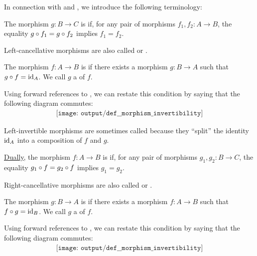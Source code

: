 \begin{definition}\label{def:morphism_invertibility}
  In connection with  and , we introduce the following terminology:
  \begin{thmenum}
     The morphism \( g: B \to C \) is  if, for any pair of morphisms \( f_1, f_2: A \to B \), the equality \( g \bincirc f_1 = g \bincirc f_2 \) implies \( f_1 = f_2 \).

    Left-cancellative morphisms are also called  or .

     The morphism \( f: A \to B \) is  if there exists a morphism \( g: B \to A \) such that \( g \bincirc f = \id_A \). We call \( g \) a  of \( f \).

    Using forward references to , we can restate this condition by saying that the following diagram commutes:
    \begin{equation}\label{eq:def:morphism_invertibility/left_invertible}
      \begin{aligned}
        \texttt{[image: output/def\_\_morphism\_invertibility]}
      \end{aligned}
    \end{equation}

    Left-invertible morphisms are sometimes called  because they \enquote{split} the identity \( \operatorname{id}_A \) into a composition of \( f \) and \( g \).

     \hyperref[thm:categorical_principle_of_duality]{Dually}, the morphism \( f: A \to B \) is  if, for any pair of morphisms \( g_1, g_2: B \to C \), the equality \( g_1 \bincirc f = g_2 \bincirc f \) implies \( g_1 = g_2 \).

    Right-cancellative morphisms are also called  or .

     The morphism \( g: B \to A \) is  if there exists a morphism \( f: A \to B \) such that \( f \bincirc g = \id_B \). We call \( g \) a  of \( f \).

    Using forward references to , we can restate this condition by saying that the following diagram commutes:
    \begin{equation}\label{eq:def:morphism_invertibility/right_invertible}
      \begin{aligned}
        \texttt{[image: output/def\_\_morphism\_invertibility]}
      \end{aligned}
    \end{equation}


\end{thmenum}
\end{definition}
